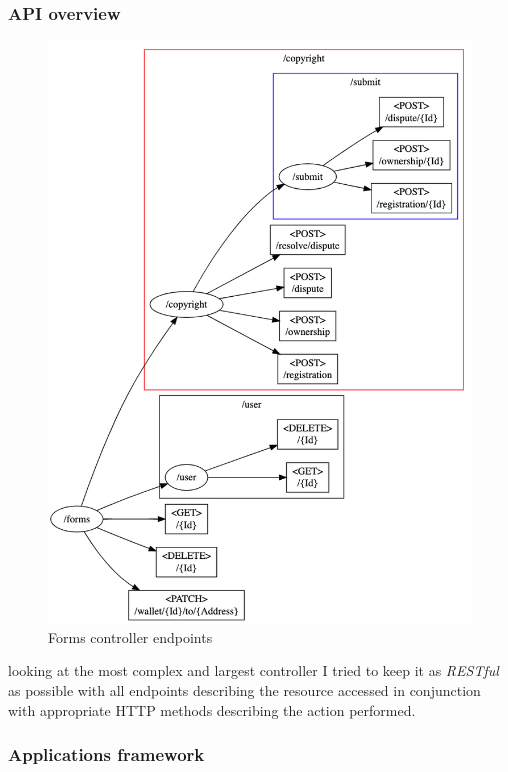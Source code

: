 \subsubsection{API overview}
\begin{figure}[H]
\caption{Forms controller endpoints}
\centering
\includegraphics[width=\textwidth,height=0.5\textheight,keepaspectratio]{images/operational/Forms-Api}
\end{figure}

looking at the most complex and largest controller I tried to keep it as \textit{RESTful} as possible with all endpoints describing the resource accessed in conjunction with appropriate HTTP methods describing the action performed.

\subsubsection{Applications framework}

